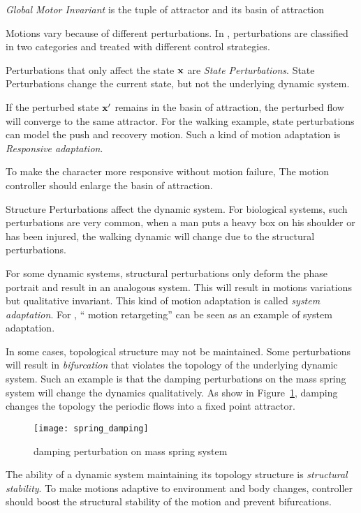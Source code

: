 \begin{mydef}
\emph{Global Motor Invariant} is the tuple of attractor and its basin of attraction
\end{mydef}


Motions vary because of different perturbations.
In \moit, perturbations are classified in two categories and treated with different control strategies.

\begin{itemize}

Perturbations that only affect the state $\mathbf{x}$ are \emph{State Perturbations}.
State Perturbations change the current state, but not the underlying dynamic system.


If the perturbed state $\mathbf{x}'$ remains in the basin of attraction, the perturbed flow will converge to the same attractor. 
For the walking example, state perturbations can model the push and recovery motion.
Such a kind of motion adaptation is \emph{Responsive adaptation}.


To make the character more responsive without motion failure,
The motion controller should enlarge the basin of attraction.






Structure Perturbations affect the dynamic system.
For biological systems,  such perturbations are very common, when a man puts a heavy box on his shoulder or has been injured, the walking dynamic will change due to the structural perturbations.


For some dynamic systems, structural perturbations only deform the phase portrait and result in an analogous system.
This will result in motions variations but qualitative invariant. This kind of motion adaptation is called \emph{system adaptation}.
For \cms, `` motion retargeting'' can be seen as an example of system adaptation.

In some cases, topological structure may not be maintained.
Some perturbations will result in \emph{bifurcation} that violates the topology of the underlying dynamic system.
Such an  example is that the damping perturbations on the mass spring system will change the dynamics qualitatively.
As show in Figure~\ref{fig:dampmass}, damping changes the topology the periodic flows into a fixed point attractor.

\begin{figure}
\begin{center}
\texttt{[image: spring\_damping]}
\end{center}
\caption{damping perturbation on mass spring system}
\label{fig:dampmass}
\end{figure}

The ability of a dynamic system maintaining its topology structure is \emph{structural stability}.
To make motions adaptive to environment and body changes, controller should boost the structural stability of the motion and prevent bifurcations.
\end{itemize}

